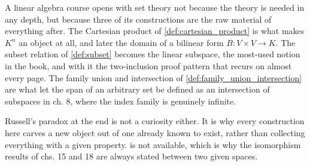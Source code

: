 \begin{ainote}
A linear algebra course opens with set theory not because the theory is needed in
any depth, but because three of its constructions are the raw material of
everything after. The Cartesian product of \cref{def:cartesian_product} is what
makes $K^n$ an object at all, and later the domain of a bilinear form
$B \colon V \times V \to K$. The subset relation of \cref{def:subset} becomes the
linear subspace, the most-used notion in the book, and with it the two-inclusion
proof pattern that recurs on almost every page. The family union and intersection
of \cref{def:family_union_intersection} are what let the span of an arbitrary set
be defined as an intersection of subspaces in ch. 8, where the index family is
genuinely infinite.

Russell's paradox at the end is not a curiosity either. It is why every
construction here carves a new object out of one already known to exist, rather
than collecting everything with a given property.  is not available, which is why the isomorphism results of chs. 15 and 18
are always stated between two given spaces.
\end{ainote}



